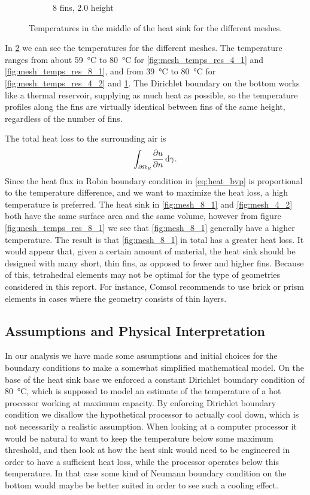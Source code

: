 \begin{figure}[ht]
\begin{subfigure}[t] {0.23\textwidth}
\caption{8 fins, \num{2.0} height}
\label{fig:mesh_temps_res_8_2}
\end{subfigure}
\caption{Temperatures in the middle of the heat sink for the different meshes.}
\label{fig:mesh_temps}
\end{figure}

In \cref{fig:mesh_temps} we can see the temperatures for the different meshes. The temperature ranges from about \SI{59}{\celsius} to \SI{80}{\celsius} for \cref{fig:mesh_temps_res_4_1} and \cref{fig:mesh_temps_res_8_1}, and from \SI{39}{\celsius} to \SI{80}{\celsius} for \cref{fig:mesh_temps_res_4_2} and \cref{fig:mesh_temps_res_8_2}. The Dirichlet boundary on the bottom works like a thermal reservoir, supplying as much heat as possible, so the temperature profiles along the fins are virtually identical between fins of the same height, regardless of the number of fins.

The total heat loss to the surrounding air is
\begin{equation}
\int_{\partial\Omega_R}\! \pdv{u}{n}\, \mathrm{d}{\gamma}.
\end{equation}
Since the heat flux in Robin boundary condition in \eqref{eq:heat_bvp} is proportional to the temperature difference, and we want to maximize the heat loss, a high temperature is preferred. The heat sink in \cref{fig:mesh_8_1} and \cref{fig:mesh_4_2} both have the same surface area and the same volume, however from figure \cref{fig:mesh_temps_res_8_1} we see that \cref{fig:mesh_8_1} generally have a higher temperature. The result is that \cref{fig:mesh_8_1} in total has a greater heat loss. It would appear that, given a certain amount of material, the heat sink should be designed with many short, thin fins, as opposed to fewer and higher fins. Because of this, tetrahedral elements may not be optimal for the type of geometries considered in this report. For instance, Comsol \cite{comsol_mesh_types} recommends to use brick or prism elements in cases where the geometry consists of thin layers.

\subsection{Assumptions and Physical Interpretation}
In our analysis we have made some assumptions and initial choices for the boundary conditions to make a somewhat simplified mathematical model. On the base of the heat sink base we enforced a constant Dirichlet boundary condition of \SI{80}{\celsius}, which is supposed to model an estimate of the temperature of a hot processor working at maximum capacity. By enforcing Dirichlet boundary condition we disallow the hypothetical processor to actually cool down, which is not necessarily a realistic assumption. When looking at a computer processor it would be natural to want to keep the temperature below some maximum threshold, and then look at how the heat sink would need to be engineered in order to have a sufficient heat loss, while the processor operates below this temperature. In that case some kind of Neumann boundary condition on the bottom would maybe be better suited in order to see such a cooling effect.

